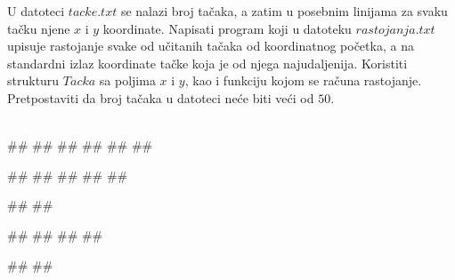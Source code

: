\begin{Exercise}[label=p3_07] 
 U datoteci $tacke.txt$ se nalazi broj tačaka, a zatim u posebnim linijama za svaku tačku njene $x$ i $y$ koordinate. Napisati program koji u datoteku $rastojanja.txt$ upisuje rastojanje svake od učitanih tačaka od koordinatnog početka, a na standardni izlaz koordinate tačke koja je od njega najudaljenija. Koristiti strukturu $Tacka$ sa poljima $x$ i $y$, kao i funkciju kojom se računa rastojanje. Pretpostaviti da broj tačaka u datoteci neće biti veći od $50$. \\  
\\
\begin{miditest}
\begin{upotreba}{1}
##
##
##
##
##
##

##
##
##
##
##

#\naslovIzlaz#
##
\end{upotreba}
\end{miditest}
\begin{miditest}
\begin{upotreba}{2}
##
##
##
##

#\naslovIzlaz#
##
\end{upotreba}
\end{miditest}
\end{Exercise}
\begin{Answer}[ref=p3_07]
\end{Answer}

